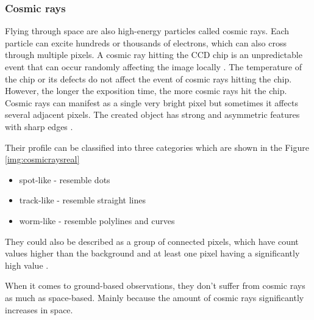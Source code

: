     \subsubsection{Cosmic rays}
    
    Flying through space are also high-energy particles called cosmic rays.  Each particle can excite hundreds or thousands of electrons, which can also cross through multiple pixels. 
    A cosmic ray hitting the CCD chip is an unpredictable event that can occur randomly affecting the image locally \cite{imageProc}. The temperature of the chip or its defects do not affect the event of cosmic rays hitting the chip. However, the longer the exposition time, the more cosmic rays hit the chip. 
    Cosmic rays can manifest as a single very bright pixel but sometimes it affects several adjacent pixels. The created object has strong and asymmetric features with sharp edges \cite{irafArticle}.
    
    Their profile can be classified into three categories \cite{inbookCosmics} which are shown in the Figure \ref{img:cosmicraysreal}  
        \begin{itemize}
            \item spot-like - resemble dots
            \item track-like - resemble straight lines
            \item worm-like - resemble polylines and curves
        \end{itemize}
    
    
    They could also be described as a group of connected pixels, which have count values higher than the background and at least one pixel having a significantly high value \cite{inbookCosmics}.
    
    When it comes to ground-based observations, they don't suffer from cosmic rays as much as space-based. Mainly because the amount of cosmic rays significantly increases in space. 

